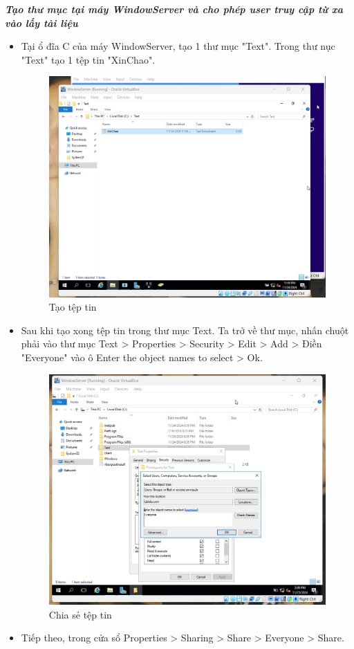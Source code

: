  \textbf{\textit{Tạo thư mục tại máy WindowServer và cho phép user truy cập từ xa vào lấy tài liệu}}

   \begin{itemize}
      \item Tại ổ đĩa C của máy WindowServer, tạo 1 thư mục "Text". Trong thư nục "Text" tạo 1 tệp tin "XinChao".

    \begin{figure}[htbp]
        \centering
        \includegraphics[width=0.6\linewidth]{RemoteAccessVPNimg/CreateFile_SV.png}
        \caption{Tạo tệp tin}
    \end{figure}
\newpage
    \item Sau khi tạo xong tệp tin trong thư mục Text. Ta trở về thư mục, nhấn chuột phải vào thư mục Text > Properties > Security > Edit > Add > Điền "Everyone" vào ô Enter the object names to select > Ok.

    \begin{figure}[htbp]
        \centering
        \includegraphics[width=0.6\linewidth]{RemoteAccessVPNimg/ShareFile_SV (3).png}
        \caption{Chia sẻ tệp tin}
    \end{figure}

    \item Tiếp theo, trong cửa sổ Properties > Sharing > Share > Everyone > Share.


\end{itemize}
